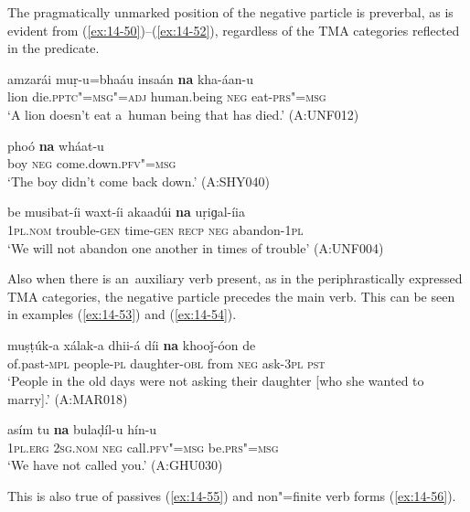 The pragmatically unmarked position of the negative particle is preverbal, as is evident from (\ref{ex:14-50})--(\ref{ex:14-52}), regardless of the TMA categories reflected in the predicate.

\begin{exe}
\ex
\label{ex:14-50}
\gll amzarái muṛ-u=bhaáu insaán \textbf{na} kha-áan-u \\
lion die.\textsc{pptc"=msg"=adj} human.being \textsc{neg} eat-\textsc{prs"=msg} \\
\glt `A lion doesn't eat a~human being that has died.' (A:UNF012)

\ex
\label{ex:14-51}
\gll phoó \textbf{na} wháat-u \\
boy \textsc{neg} come.down.\textsc{pfv"=msg } \\
\glt `The boy didn't come back down.' (A:SHY040)

\ex
\label{ex:14-52}
\gll be musibat-íi waxt-íi akaadúi \textbf{na} uṛiɡal-íia\\
\textsc{1pl.nom} trouble-\textsc{gen} time-\textsc{gen} \textsc{recp} \textsc{neg} abandon-\textsc{1pl}\\
\glt `We will not abandon one another in times of trouble' (A:UNF004)
\end{exe}

Also when there is an~auxiliary verb present, as in the periphrastically expressed TMA categories, the negative particle precedes the main verb. This can be seen in examples (\ref{ex:14-53}) and (\ref{ex:14-54}).

\begin{exe}
\ex
\label{ex:14-53}
\gll muṣṭúk-a xálak-a dhii-á díi \textbf{na} khooǰ-óon de \\
of.past-\textsc{mpl} people-\textsc{pl} daughter-\textsc{obl} from \textsc{neg} ask-\textsc{3pl} \textsc{pst}  \\
\glt `People in the old days were not asking their daughter [who she wanted to marry].' (A:MAR018)

\ex
\label{ex:14-54}
\gll asím tu \textbf{na} bulaḍíl-u hín-u \\
\textsc{1pl.erg} \textsc{2sg.nom} \textsc{neg} call.\textsc{pfv"=msg} be.\textsc{prs"=msg} \\
\glt `We have not called you.' (A:GHU030)
\end{exe}

This is also true of passives (\ref{ex:14-55}) and non"=finite verb forms (\ref{ex:14-56}).


